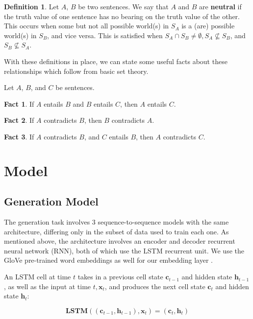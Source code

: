 \documentclass[a4paper, 12pt]{article}
\theoremstyle{definition}
\newtheorem{definition}{Definition}[section]
\newtheorem{fact}{Fact}[section]
\begin{document}
\begin{definition}
	Let $A$, $B$ be two sentences. We say that $A$ and $B$ are \textbf{neutral} if the truth value of one sentence has no bearing on the truth value of the other. This occurs when some but not all possible world(s) in $S_A$ is a (are) possible world(s) in $S_B$, and vice versa. This is satisfied when $S_A \cap S_B \neq \emptyset, S_A \nsubseteq S_B$, and $S_B \nsubseteq S_A$. \end{definition}

With these definitions in place, we can state some useful facts about these relationships which follow from basic set theory.

\bigskip

Let $A$, $B$, and $C$ be sentences.

\begin{fact}
	If $A$ entails $B$ and $B$ entails $C$, then $A$ entails $C$.
\end{fact}
\begin{fact}
	If $A$ contradicts $B$, then $B$ contradicts $A$.
\end{fact}
\begin{fact}
	If $A$ contradicts $B$, and $C$ entails $B$, then $A$ contradicts $C$.
\end{fact}

\section{Model}

\subsection{Generation Model}

The generation task involves 3 sequence-to-sequence models with the same architecture, differing only in the subset of data used to train each one. As mentioned above, the architecture involves an encoder and decoder recurrent neural network (RNN), both of which use the LSTM \cite{lstm-schmid} recurrent unit. We use the GloVe pre-trained word embeddings as well for our embedding layer \cite{glove}.

\bigskip

An LSTM cell at time $t$ takes in a previous cell state $\mathbf{c}_{t-1}$ and hidden state $\mathbf{h}_{t-1}$, as well as the input at time $t, \mathbf{x}_t$, and produces the next cell state $\mathbf{c}_t$ and hidden state $\mathbf{h}_t$:

\[\textbf{LSTM}((\mathbf{c}_{t-1}, \mathbf{h}_{t-1}), \mathbf{x}_{t}) = (\mathbf{c}_{t}, \mathbf{h}_{t})\]
\end{document}

